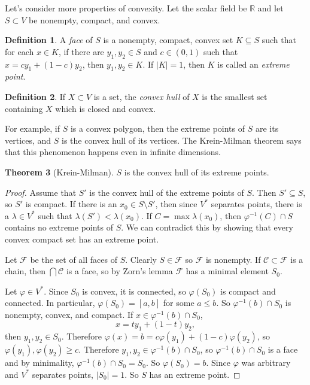 \documentclass[12pt]{report}
\newcommand{\RR}{\mathbb{R}}
\newcommand{\dfn}[1]{\emph{#1}\index{#1}}
\theoremstyle{definition}
\newtheorem{theorem}{Theorem}[chapter]
\newtheorem{definition}[theorem]{Definition}
\begin{document}
    Let's consider more properties of convexity. Let the scalar field be $\RR$ and let $S \subset V$ be nonempty, compact, and convex.
\begin{definition}
    A \dfn{face} of $S$ is a nonempty, compact, convex set $K \subseteq S$ such that for each $x \in K$, if there are $y_1, y_2 \in S$ and $c \in (0, 1)$ such that $x = cy_1 + (1-c)y_2$, then $y_1, y_2 \in K$. If $|K| = 1$, then $K$ is called an \dfn{extreme point}.
\end{definition}
\begin{definition}
    If $X \subset V$ is a set, the \dfn{convex hull} of $X$ is the smallest set containing $X$ which is closed and convex.
\end{definition}
    For example, if $S$ is a convex polygon, then the extreme points of $S$ are its vertices, and $S$ is the convex hull of its vertices. The Krein-Milman theorem says that this phenomenon happens even in infinite dimensions.
\begin{theorem}[Krein-Milman]
    $S$ is the convex hull of its extreme points.
\end{theorem}
\begin{proof}
    Assume that $S'$ is the convex hull of the extreme points of $S$. Then $S' \subseteq S$, so $S'$ is compact. If there is an $x_0 \in S \setminus S'$, then since $V^*$ separates points, there is a $\lambda \in V^*$ such that $\lambda(S') < \lambda(x_0)$. If $C = \max \lambda(x_0)$, then $\varphi^{-1}(C) \cap S$ contains no extreme points of $S$. We can contradict this by showing that every convex compact set has an extreme point.

    Let $\mathcal F$ be the set of all faces of $S$. Clearly $S \in \mathcal F$ so $\mathcal F$ is nonempty. If $\mathcal C \subset \mathcal F$ is a chain, then $\bigcap \mathcal C$ is a face, so by Zorn's lemma $\mathcal F$ has a minimal element $S_0$.

    Let $\varphi \in V^*$. Since $S_0$ is convex, it is connected, so $\varphi(S_0)$ is compact and connected. In particular, $\varphi(S_0) = [a, b]$ for some $a \leq b$. So $\varphi^{-1}(b) \cap S_0$ is nonempty, convex, and compact. If $x \in \varphi^{-1}(b) \cap S_0$,
    $$x = ty_1 + (1-t)y_2,$$
    then $y_1,y_2 \in S_0$. Therefore $\varphi(x) = b = c\varphi(y_1) + (1-c)\varphi(y_2)$, so $\varphi(y_1), \varphi(y_2) \geq c$. Therefore $y_1, y_2 \in \varphi^{-1}(b) \cap S_0$, so $\varphi^{-1}(b) \cap S_0$ is a face and by minimality, $\varphi^{-1}(b) \cap S_0 = S_0$. So $\varphi(S_0) = b$. Since $\varphi$ was arbitrary and $V^*$ separates points, $|S_0| = 1$. So $S$ has an extreme point.
\end{proof}
\end{document}
